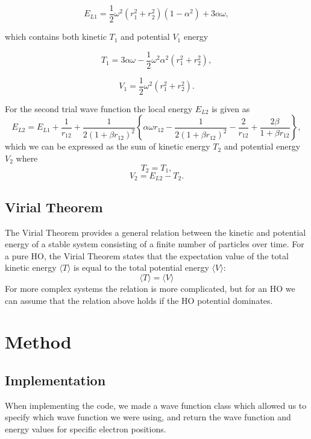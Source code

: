 \documentclass[norsk,a4paper,12pt]{article}
\begin{document}
\begin{equation}
E_{L1} = \frac{1}{2}\omega^2 (r_1^2 + r_2^2)(1-\alpha^2) + 3\alpha \omega,
\label{eq:EL1}
\end{equation}

which contains both kinetic $T_1$ and potential $V_1$ energy

\begin{equation}
T_1 = 3\alpha \omega -\frac{1}{2}\omega^2\alpha^2\left(r_1^2 + r_2^2\right),
\label{eq:T_1}
\end{equation}

\begin{equation}
V_1 = \frac{1}{2}\omega^2(r_1^2 + r_2^2).
\end{equation}

For the second trial wave function the local energy $E_{L2}$\cite{Project_text} is given as
\begin{equation}
E_{L2} = E_{L1} + \frac{1}{r_{12}} + \frac{1}{2(1+\beta r_{12})^2}\left\{\alpha\omega r_{12}-\frac{1}{2(1+\beta r_{12})^2}-\frac{2}{r_{12}}+\frac{2\beta}{1+\beta r_{12}}\right\},
\label{eq:EL2}
\end{equation}
which we can be expressed as the sum of kinetic energy $T_2$ and potential energy $V_2$ where
$$T_2 = T_1,$$
$$V_2 = E_{L2} - T_2.$$
\subsection{Virial Theorem}
The Virial Theorem provides a general relation between the kinetic and potential energy of a stable system consisting of a finite number of particles over time. For  a pure HO, the Virial Theorem states that the expectation value of the total kinetic energy $\langle T\rangle$ is equal to the total potential energy $\langle V\rangle$:
\begin{equation}
\langle T\rangle=\langle V\rangle
\label{eq:virial}
\end{equation}
For more complex systems the relation is more complicated, but for an HO we can assume that the relation above holds if the HO potential dominates.


\section{Method} \label{Method}


\subsection{Implementation}
When implementing the code, we made a wave function class which allowed us to specify which wave function we were using, and return the wave function and energy values for specific electron positions.
\par 
\vspace{2mm}
\end{document}
